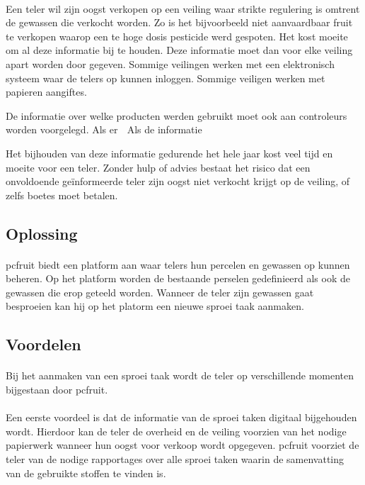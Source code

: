 \paragraph {} Een teler wil zijn oogst verkopen op een veiling waar strikte regulering is
omtrent de gewassen die verkocht worden. Zo is het bijvoorbeeld niet aanvaardbaar fruit te
verkopen waarop een te hoge dosis pesticide werd gespoten. Het kost moeite om al deze
informatie bij te houden. Deze informatie moet dan voor elke veiling apart worden door
gegeven. Sommige veilingen werken met een elektronisch systeem waar de telers op kunnen
inloggen. Sommige veiligen werken met papieren aangiftes.

De informatie over welke producten werden gebruikt moet ook aan controleurs worden
voorgelegd. Als er 
Als de informatie 

Het bijhouden van deze
informatie gedurende het hele jaar kost veel tijd en moeite voor een teler. Zonder hulp of
advies bestaat het risico dat een onvoldoende geïnformeerde teler zijn oogst niet verkocht
krijgt op de veiling, of zelfs boetes moet betalen.


\subsection {Oplossing}

\paragraph {} pcfruit biedt een platform aan waar telers hun percelen en gewassen op
kunnen beheren. Op het platform worden de bestaande perselen gedefinieerd als ook de
gewassen die erop geteeld worden. Wanneer de teler zijn gewassen gaat besproeien kan hij
op het platorm een nieuwe sproei taak aanmaken.


\subsection {Voordelen}

\paragraph {} Bij het aanmaken van een sproei taak wordt de teler op verschillende
momenten bijgestaan door pcfruit.

\paragraph {} Een eerste voordeel is dat de informatie van de sproei taken digitaal
bijgehouden wordt.  Hierdoor kan de teler de overheid en de veiling voorzien van het
nodige papierwerk wanneer hun oogst voor verkoop wordt opgegeven. pcfruit voorziet de
teler van de nodige rapportages over alle sproei taken waarin de samenvatting van de
gebruikte stoffen te vinden is.

